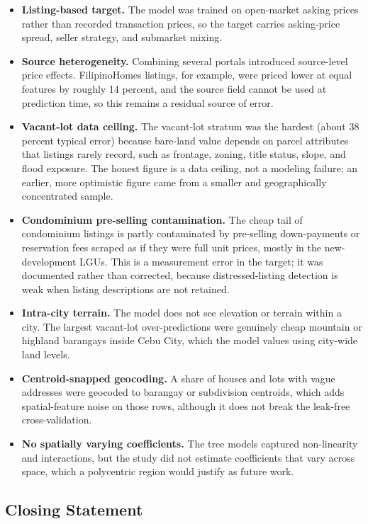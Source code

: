 \begin{itemize}
\item \textbf{Listing-based target.} The model was trained on open-market asking prices rather than recorded transaction prices, so the target carries asking-price spread, seller strategy, and submarket mixing.
\item \textbf{Source heterogeneity.} Combining several portals introduced source-level price effects. FilipinoHomes listings, for example, were priced lower at equal features by roughly 14 percent, and the source field cannot be used at prediction time, so this remains a residual source of error.
\item \textbf{Vacant-lot data ceiling.} The vacant-lot stratum was the hardest (about 38 percent typical error) because bare-land value depends on parcel attributes that listings rarely record, such as frontage, zoning, title status, slope, and flood exposure. The honest figure is a data ceiling, not a modeling failure; an earlier, more optimistic figure came from a smaller and geographically concentrated sample.
\item \textbf{Condominium pre-selling contamination.} The cheap tail of condominium listings is partly contaminated by pre-selling down-payments or reservation fees scraped as if they were full unit prices, mostly in the new-development LGUs. This is a measurement error in the target; it was documented rather than corrected, because distressed-listing detection is weak when listing descriptions are not retained.
\item \textbf{Intra-city terrain.} The model does not see elevation or terrain within a city. The largest vacant-lot over-predictions were genuinely cheap mountain or highland barangays inside Cebu City, which the model values using city-wide land levels.
\item \textbf{Centroid-snapped geocoding.} A share of houses and lots with vague addresses were geocoded to barangay or subdivision centroids, which adds spatial-feature noise on those rows, although it does not break the leak-free cross-validation.
\item \textbf{No spatially varying coefficients.} The tree models captured non-linearity and interactions, but the study did not estimate coefficients that vary across space, which a polycentric region would justify as future work.
\end{itemize}

\subsection{Closing Statement}\label{closing-statement}

